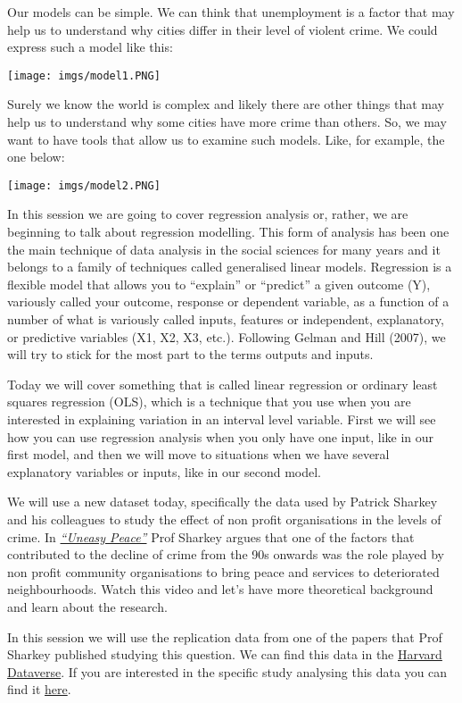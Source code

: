 \documentclass[
]{book}
\begin{document}
Our models can be simple. We can think that unemployment is a factor that may help us to understand why cities differ in their level of violent crime. We could express such a model like this:

\texttt{[image: imgs/model1.PNG]}

Surely we know the world is complex and likely there are other things that may help us to understand why some cities have more crime than others. So, we may want to have tools that allow us to examine such models. Like, for example, the one below:

\texttt{[image: imgs/model2.PNG]}

In this session we are going to cover regression analysis or, rather, we are beginning to talk about regression modelling. This form of analysis has been one the main technique of data analysis in the social sciences for many years and it belongs to a family of techniques called generalised linear models. Regression is a flexible model that allows you to ``explain'' or ``predict'' a given outcome (Y), variously called your outcome, response or dependent variable, as a function of a number of what is variously called inputs, features or independent, explanatory, or predictive variables (X1, X2, X3, etc.). Following Gelman and Hill (2007), we will try to stick for the most part to the terms outputs and inputs.

Today we will cover something that is called linear regression or ordinary least squares regression (OLS), which is a technique that you use when you are interested in explaining variation in an interval level variable. First we will see how you can use regression analysis when you only have one input, like in our first model, and then we will move to situations when we have several explanatory variables or inputs, like in our second model.

We will use a new dataset today, specifically the data used by Patrick Sharkey and his colleagues to study the effect of non profit organisations in the levels of crime. In \href{https://books.wwnorton.com/books/Uneasy-Peace/}{\emph{``Uneasy Peace''}} Prof Sharkey argues that one of the factors that contributed to the decline of crime from the 90s onwards was the role played by non profit community organisations to bring peace and services to deteriorated neighbourhoods. Watch this video and let's have more theoretical background and learn about the research.

In this session we will use the replication data from one of the papers that Prof Sharkey published studying this question. We can find this data in the \href{https://dataverse.harvard.edu/dataset.xhtml?persistentId=doi:10.7910/DVN/46WIH0}{Harvard Dataverse}. If you are interested in the specific study analysing this data you can find it \href{https://journals.sagepub.com/doi/abs/10.1177/0003122417736289}{here}.
\end{document}
